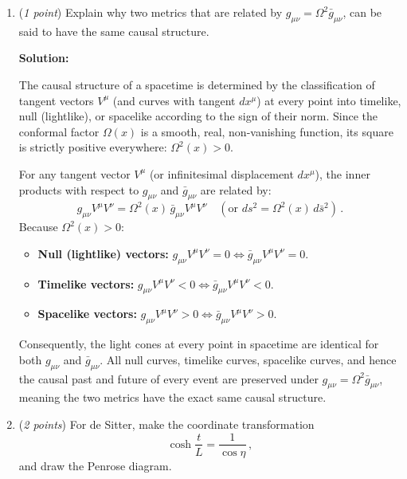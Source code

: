 \documentclass[12pt]{article}
\newcommand{\be}{\begin{equation}}
\newcommand{\ee}{\end{equation}}
\begin{document}
\begin{enumerate}[label=\alph*)]
\noindent\textbf{2. The Scale Factor:}

Comparing the metric \eqref{dsmetric} directly with the standard FLRW form $ds^2 = -dt^2 + a(t)^2 \left[ d\chi^2 + \sin^2\chi(d\theta^2 + \sin^2\theta d\phi^2) \right]$, the scale factor is:
\be
\boxed{a(t) = L \cosh\left(\frac{t}{L}\right) \,,}
\ee
(or in the convention where the spatial curvature radius $L$ is retained inside the spatial metric, the dimensionless scale factor is $a(t) = \cosh(t/L)$).

\item (\emph{1 point}) Explain why two metrics that are related by $g_{\mu\nu} = \Omega^2 \bar g_{\mu\nu}$, can be said to have the same causal structure. 

\medskip
\noindent\textbf{Solution:}

The causal structure of a spacetime is determined by the classification of tangent vectors $V^\mu$ (and curves with tangent $dx^\mu$) at every point into timelike, null (lightlike), or spacelike according to the sign of their norm. Since the conformal factor $\Omega(x)$ is a smooth, real, non-vanishing function, its square is strictly positive everywhere: $\Omega^2(x) > 0$. 

For any tangent vector $V^\mu$ (or infinitesimal displacement $dx^\mu$), the inner products with respect to $g_{\mu\nu}$ and $\bar{g}_{\mu\nu}$ are related by:
\be
g_{\mu\nu} V^\mu V^\nu = \Omega^2(x) \, \bar{g}_{\mu\nu} V^\mu V^\nu \quad \left(\text{or } ds^2 = \Omega^2(x) \, d\bar{s}^2\right) \,.
\ee
Because $\Omega^2(x) > 0$:
\begin{itemize}
\item \textbf{Null (lightlike) vectors:} $g_{\mu\nu} V^\mu V^\nu = 0 \iff \bar{g}_{\mu\nu} V^\mu V^\nu = 0$.
\item \textbf{Timelike vectors:} $g_{\mu\nu} V^\mu V^\nu < 0 \iff \bar{g}_{\mu\nu} V^\mu V^\nu < 0$.
\item \textbf{Spacelike vectors:} $g_{\mu\nu} V^\mu V^\nu > 0 \iff \bar{g}_{\mu\nu} V^\mu V^\nu > 0$.
\end{itemize}
Consequently, the light cones at every point in spacetime are identical for both $g_{\mu\nu}$ and $\bar{g}_{\mu\nu}$. All null curves, timelike curves, spacelike curves, and hence the causal past and future of every event are preserved under $g_{\mu\nu} = \Omega^2 \bar{g}_{\mu\nu}$, meaning the two metrics have the exact same causal structure.

\item (\emph{2 points}) For de Sitter, make the coordinate transformation
\be
\cosh \frac{t}{L} = \frac{1}{\cos \eta} \,,
\ee
and draw the Penrose diagram. 


\end{enumerate}
\end{document}
